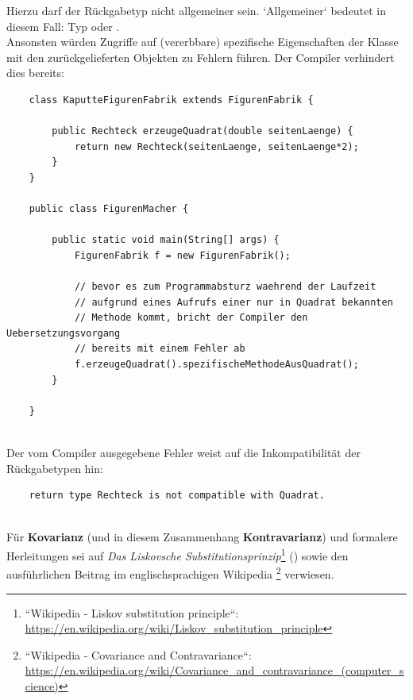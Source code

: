 \noindent
Hierzu darf der Rückgabetyp nicht allgemeiner sein. `Allgemeiner` bedeutet in diesem Fall: Typ  oder .\\

\noindent
Ansonsten würden Zugriffe auf (vererbbare) spezifische Eigenschaften der Klasse  mit den zurückgelieferten Objekten zu Fehlern führen.
Der Compiler verhindert dies bereits:

\begin{verbatim}
    class KaputteFigurenFabrik extends FigurenFabrik {

        public Rechteck erzeugeQuadrat(double seitenLaenge) {
            return new Rechteck(seitenLaenge, seitenLaenge*2);
        }
    }

    public class FigurenMacher {

        public static void main(String[] args) {
            FigurenFabrik f = new FigurenFabrik();

            // bevor es zum Programmabsturz waehrend der Laufzeit
            // aufgrund eines Aufrufs einer nur in Quadrat bekannten
            // Methode kommt, bricht der Compiler den Uebersetzungsvorgang
            // bereits mit einem Fehler ab
            f.erzeugeQuadrat().spezifischeMethodeAusQuadrat();
        }

    }
\end{verbatim}\\

\noindent
Der vom Compiler ausgegebene Fehler weist auf die Inkompatibilität der Rückgabetypen hin:\\

\begin{verbatim}
    return type Rechteck is not compatible with Quadrat.
\end{verbatim}\\

\noindent
Für \textbf{Kovarianz} (und in diesem Zusammenhang \textbf{Kontravarianz}) und formalere Herleitungen sei auf
\textit{Das Liskovsche Substitutionsprinzip}\footnote{``Wikipedia - Liskov substitution principle``: \url{https://en.wikipedia.org/wiki/Liskov_substitution_principle}} (\cite{Lis87})
sowie den ausführlichen Beitrag im englischsprachigen Wikipedia \footnote{
    ``Wikipedia - Covariance and Contravariance``: \url{https://en.wikipedia.org/wiki/Covariance_and_contravariance_(computer_science)}
} verwiesen.
